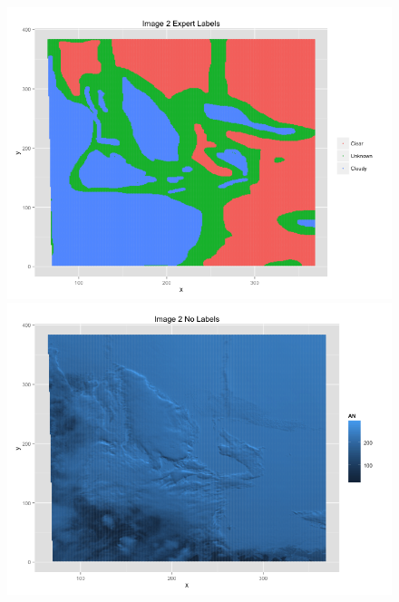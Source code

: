 \documentclass{article}\usepackage[]{graphicx}\usepackage[]{color}
\begin{document}
\begin{figure}
\includegraphics[scale = .35]{Image2Experts.png}
\includegraphics[scale = .35]{Image2Raw.png}


\end{figure}
\end{document}
